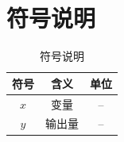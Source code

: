 
\section{符号说明}

\begin{table}[H]
\centering

\caption{符号说明}

\begin{tabular}{ccc}
\toprule
符号 & 含义 & 单位\\
\midrule
$x$ & 变量 & --\\
$y$ & 输出量 & --\\
\bottomrule
\end{tabular}

\end{table}
